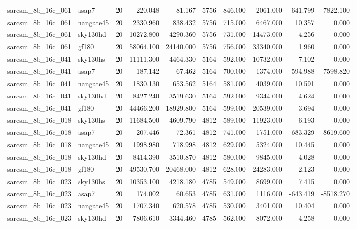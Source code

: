 \documentclass{article}
\begin{document}
\begin{longtable}{llrrrrrrrr}
sarcsm\_8b\_16c\_061 & asap7 & 20 & 220.048 & 81.167 & 5756 & 846.000 & 2061.000 & -641.799 & -7822.100 \\
sarcsm\_8b\_16c\_061 & nangate45 & 20 & 2330.960 & 838.432 & 5756 & 715.000 & 6467.000 & 10.357 & 0.000 \\
sarcsm\_8b\_16c\_061 & sky130hd & 20 & 10272.800 & 4290.360 & 5756 & 731.000 & 14473.000 & 4.256 & 0.000 \\
sarcsm\_8b\_16c\_061 & gf180 & 20 & 58064.100 & 24140.000 & 5756 & 756.000 & 33340.000 & 1.960 & 0.000 \\
sarcsm\_8b\_16c\_041 & sky130hs & 20 & 11111.300 & 4464.330 & 5164 & 592.000 & 10732.000 & 7.102 & 0.000 \\
sarcsm\_8b\_16c\_041 & asap7 & 20 & 187.142 & 67.462 & 5164 & 700.000 & 1374.000 & -594.988 & -7598.820 \\
sarcsm\_8b\_16c\_041 & nangate45 & 20 & 1830.130 & 653.562 & 5164 & 581.000 & 4039.000 & 10.591 & 0.000 \\
sarcsm\_8b\_16c\_041 & sky130hd & 20 & 8427.240 & 3519.630 & 5164 & 592.000 & 9344.000 & 4.624 & 0.000 \\
sarcsm\_8b\_16c\_041 & gf180 & 20 & 44466.200 & 18929.800 & 5164 & 599.000 & 20539.000 & 3.694 & 0.000 \\
sarcsm\_8b\_16c\_018 & sky130hs & 20 & 11684.500 & 4609.790 & 4812 & 589.000 & 11923.000 & 6.193 & 0.000 \\
sarcsm\_8b\_16c\_018 & asap7 & 20 & 207.446 & 72.361 & 4812 & 741.000 & 1751.000 & -683.329 & -8619.600 \\
sarcsm\_8b\_16c\_018 & nangate45 & 20 & 1998.980 & 718.998 & 4812 & 629.000 & 5324.000 & 10.445 & 0.000 \\
sarcsm\_8b\_16c\_018 & sky130hd & 20 & 8414.390 & 3510.870 & 4812 & 580.000 & 9845.000 & 4.028 & 0.000 \\
sarcsm\_8b\_16c\_018 & gf180 & 20 & 49530.700 & 20468.000 & 4812 & 628.000 & 24283.000 & 2.123 & 0.000 \\
sarcsm\_8b\_16c\_023 & sky130hs & 20 & 10353.100 & 4218.180 & 4785 & 549.000 & 8699.000 & 7.415 & 0.000 \\
sarcsm\_8b\_16c\_023 & asap7 & 20 & 174.002 & 60.653 & 4785 & 631.000 & 1116.000 & -643.419 & -8518.270 \\
sarcsm\_8b\_16c\_023 & nangate45 & 20 & 1707.340 & 620.578 & 4785 & 530.000 & 3401.000 & 10.404 & 0.000 \\
sarcsm\_8b\_16c\_023 & sky130hd & 20 & 7806.610 & 3344.460 & 4785 & 562.000 & 8072.000 & 4.258 & 0.000 \\

\end{longtable}
\end{document}
